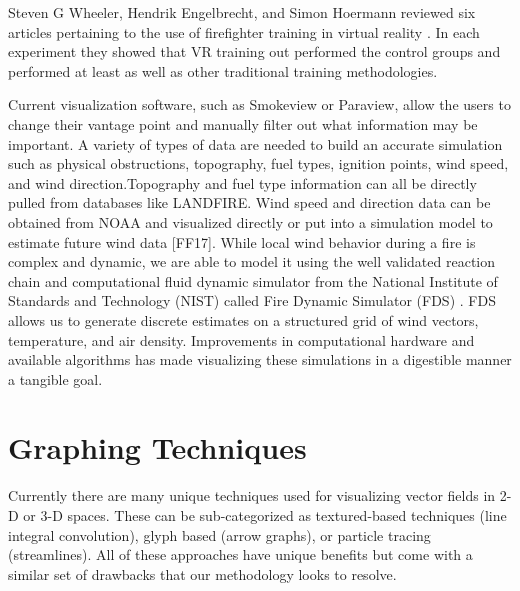 Steven G Wheeler, Hendrik Engelbrecht, and Simon Hoermann reviewed six articles pertaining to the use of firefighter training in virtual reality \cite{Wheeler2021}. In each experiment they showed that VR training out performed the control groups and performed at least as well as other traditional training methodologies.  \par

Current visualization software, such as  Smokeview or Paraview, allow the users to change their vantage point and manually filter out what information may be important. A variety of types of data are needed to build an accurate simulation such as physical  obstructions, topography, fuel types, ignition points, wind speed, and wind direction.Topography and fuel type information can all be directly pulled from databases like LANDFIRE. Wind speed and direction data can be obtained from NOAA and visualized directly or put into a simulation model to estimate future wind data [FF17]. While local wind behavior during a fire is complex and dynamic, we are able to model it using the well validated reaction chain and computational fluid dynamic simulator from the National Institute of Standards and Technology (NIST) called Fire Dynamic Simulator (FDS) \cite{FDSValid}.  FDS allows us to generate discrete estimates on a structured grid of wind vectors, temperature, and air density. Improvements in computational hardware and available algorithms has made visualizing these simulations in a digestible manner a tangible goal. 
\par






\section{Graphing Techniques}

Currently there are many unique techniques used for visualizing vector fields in 2-D or 3-D spaces. These can be sub-categorized as textured-based techniques (line integral convolution), glyph based (arrow graphs), or particle tracing (streamlines). All of these approaches have unique benefits but come with a similar set of drawbacks that our methodology looks to resolve.  \par

